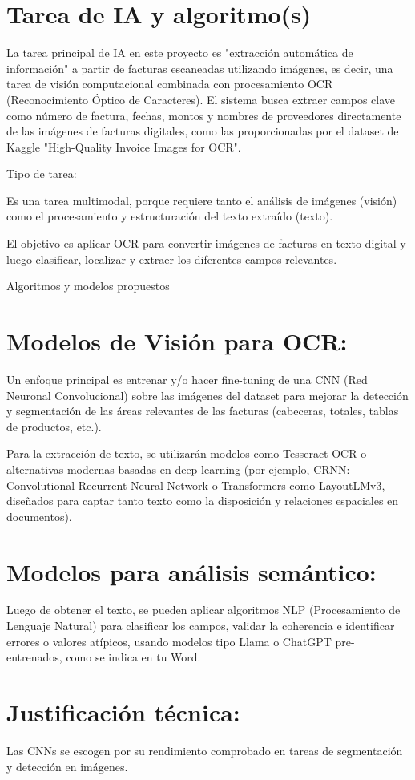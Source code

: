 \documentclass[11pt,letterpaper]{article}
\begin{document}
\section{Tarea de IA y algoritmo(s)}
La tarea principal de IA en este proyecto es "extracción automática de información" a partir de facturas escaneadas utilizando imágenes, es decir, una tarea de visión computacional combinada con procesamiento OCR (Reconocimiento Óptico de Caracteres). El sistema busca extraer campos clave como número de factura, fechas, montos y nombres de proveedores directamente de las imágenes de facturas digitales, como las proporcionadas por el dataset de Kaggle "High-Quality Invoice Images for OCR".

Tipo de tarea:

Es una tarea multimodal, porque requiere tanto el análisis de imágenes (visión) como el procesamiento y estructuración del texto extraído (texto).

El objetivo es aplicar OCR para convertir imágenes de facturas en texto digital y luego clasificar, localizar y extraer los diferentes campos relevantes.

Algoritmos y modelos propuestos

\section{Modelos de Visión para OCR:}
Un enfoque principal es entrenar y/o hacer fine-tuning de una CNN (Red Neuronal Convolucional) sobre las imágenes del dataset para mejorar la detección y segmentación de las áreas relevantes de las facturas (cabeceras, totales, tablas de productos, etc.).

Para la extracción de texto, se utilizarán modelos como Tesseract OCR o alternativas modernas basadas en deep learning (por ejemplo, CRNN: Convolutional Recurrent Neural Network o Transformers como LayoutLMv3, diseñados para captar tanto texto como la disposición y relaciones espaciales en documentos).

\section{Modelos para análisis semántico:}
Luego de obtener el texto, se pueden aplicar algoritmos NLP (Procesamiento de Lenguaje Natural) para clasificar los campos, validar la coherencia e identificar errores o valores atípicos, usando modelos tipo Llama o ChatGPT pre-entrenados, como se indica en tu Word.

\section{Justificación técnica:}
Las CNNs se escogen por su rendimiento comprobado en tareas de segmentación y detección en imágenes.
\end{document}
